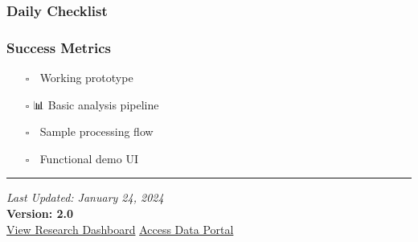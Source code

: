 \subsubsection{Daily Checklist}\label{daily-checklist}

\begin{Shaded}
\begin{Highlighting}[]
\end{Highlighting}
\end{Shaded}

\subsubsection{Success Metrics}\label{success-metrics}

\begin{itemize}
\tightlist
\item[$\square$]
  🎯 Working prototype
\item[$\square$]
  📊 Basic analysis pipeline
\item[$\square$]
  🔄 Sample processing flow
\item[$\square$]
  📱 Functional demo UI
\end{itemize}

\begin{center}\rule{0.5\linewidth}{0.5pt}\end{center}

\emph{Last Updated: January 24, 2024}\\
\textbf{Version: 2.0}\\
\href{https://lab24.ai/dashboard}{View Research Dashboard} \textbar{}
\href{https://lab24.ai/data}{Access Data Portal}
